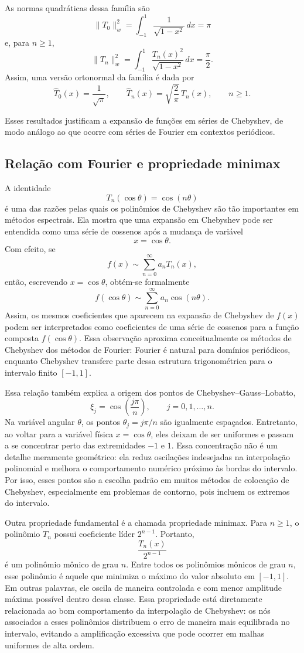 As normas quadráticas dessa família são
\[
\|T_0\|_w^2=\int_{-1}^{1}\frac{1}{\sqrt{1-x^2}}\,dx=\pi
\]
e, para \(n\geq 1\),
\[
\|T_n\|_w^2=\int_{-1}^{1}\frac{T_n(x)^2}{\sqrt{1-x^2}}\,dx=\frac{\pi}{2}.
\]
Assim, uma versão ortonormal da família é dada por
\[
\widehat{T}_0(x)=\frac{1}{\sqrt{\pi}},
\qquad
\widehat{T}_n(x)=\sqrt{\frac{2}{\pi}}\,T_n(x), \qquad n\geq 1.
\]

Esses resultados justificam a expansão de funções em séries de Chebyshev, de modo análogo ao que ocorre com séries de Fourier em contextos periódicos.


\subsection{Relação com Fourier e propriedade minimax}

A identidade
\[
T_n(\cos\theta)=\cos(n\theta)
\]
é uma das razões pelas quais os polinômios de Chebyshev são tão importantes em métodos espectrais. Ela mostra que uma expansão em Chebyshev pode ser entendida como uma série de cossenos após a mudança de variável
\[
x=\cos\theta.
\]
Com efeito, se
\[
f(x)\sim \sum_{n=0}^{\infty}a_nT_n(x),
\]
então, escrevendo \(x=\cos\theta\), obtém-se formalmente
\[
f(\cos\theta)\sim \sum_{n=0}^{\infty}a_n\cos(n\theta).
\]
Assim, os mesmos coeficientes que aparecem na expansão de Chebyshev de \(f(x)\) podem ser interpretados como coeficientes de uma série de cossenos para a função composta \(f(\cos\theta)\). Essa observação aproxima conceitualmente os métodos de Chebyshev dos métodos de Fourier: Fourier é natural para domínios periódicos, enquanto Chebyshev transfere parte dessa estrutura trigonométrica para o intervalo finito \([-1,1]\).

Essa relação também explica a origem dos pontos de Chebyshev--Gauss--Lobatto,
\[
\xi_j=\cos\left(\frac{j\pi}{n}\right),
\qquad j=0,1,\dots,n.
\]
Na variável angular \(\theta\), os pontos \(\theta_j=j\pi/n\) são igualmente espaçados. Entretanto, ao voltar para a variável física \(x=\cos\theta\), eles deixam de ser uniformes e passam a se concentrar perto das extremidades \(-1\) e \(1\). Essa concentração não é um detalhe meramente geométrico: ela reduz oscilações indesejadas na interpolação polinomial e melhora o comportamento numérico próximo às bordas do intervalo. Por isso, esses pontos são a escolha padrão em muitos métodos de colocação de Chebyshev, especialmente em problemas de contorno, pois incluem os extremos do intervalo.

Outra propriedade fundamental é a chamada propriedade minimax. Para \(n\geq1\), o polinômio \(T_n\) possui coeficiente líder \(2^{n-1}\). Portanto,
\[
\frac{T_n(x)}{2^{n-1}}
\]
é um polinômio mônico de grau \(n\). Entre todos os polinômios mônicos de grau \(n\), esse polinômio é aquele que minimiza o máximo do valor absoluto em \([-1,1]\). Em outras palavras, ele oscila de maneira controlada e com menor amplitude máxima possível dentro dessa classe. Essa propriedade está diretamente relacionada ao bom comportamento da interpolação de Chebyshev: os nós associados a esses polinômios distribuem o erro de maneira mais equilibrada no intervalo, evitando a amplificação excessiva que pode ocorrer em malhas uniformes de alta ordem.

